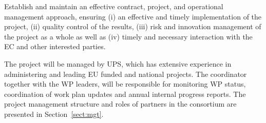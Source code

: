 \begin{workpackage}[id=management,type=MGT,wphases=0-48!.2,swsites,
  title=Project Management,short=Management,
  lead=PS,
  PSRM=28,SARM=2,  
  USORM=2,LLRM=2,UVRM=2,UJFRM=2,UBRM=2,UORM=2, USHRM=2,
  UWRM=2, JURM=2, UKRM=2, USRM=2, ZHRM=1, SRRM=2]

\begin{wpobjectives}

Establish and maintain an effective contract, project, and operational management
approach, ensuring (i) an effective and timely implementation of the project, (ii) quality control
of the results, (iii) risk and innovation management of the project as a whole as well as (iv)
timely and necessary interaction with the EC and other interested parties.

\end{wpobjectives}

\begin{wpdescription}
The project will be managed by UPS, which has extensive experience in
administering and leading EU funded and national projects. The
coordinator together with the WP leaders, will be responsible for
monitoring WP status, coordination of work plan updates and annual
internal progress reports. The project management structure and roles
of partners in the consortium are presented in Section~\ref{sect:mgt}.
\end{wpdescription}


\end{workpackage}
